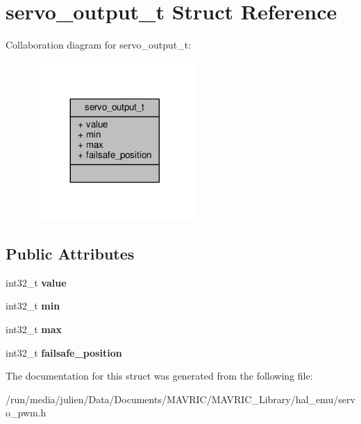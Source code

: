 \hypertarget{structservo__output__t}{\section{servo\+\_\+output\+\_\+t Struct Reference}
\label{structservo__output__t}
}


Collaboration diagram for servo\+\_\+output\+\_\+t\+:
\nopagebreak
\begin{figure}[H]
\begin{center}
\leavevmode
\includegraphics[width=176pt]{structservo__output__t__coll__graph}
\end{center}
\end{figure}
\subsection*{Public Attributes}
\begin{DoxyCompactItemize}
\item 
\hypertarget{structservo__output__t_a5e26ac76ea83f33afbe3e67ee8d6c77a}{int32\+\_\+t {\bfseries value}}\label{structservo__output__t_a5e26ac76ea83f33afbe3e67ee8d6c77a}

\item 
\hypertarget{structservo__output__t_a42b7da3c029455c14edc95ce24a130a9}{int32\+\_\+t {\bfseries min}}\label{structservo__output__t_a42b7da3c029455c14edc95ce24a130a9}

\item 
\hypertarget{structservo__output__t_a83c2d99b323a5e983512416be0366f75}{int32\+\_\+t {\bfseries max}}\label{structservo__output__t_a83c2d99b323a5e983512416be0366f75}

\item 
\hypertarget{structservo__output__t_a86899709f9318fb1960522116306f01b}{int32\+\_\+t {\bfseries failsafe\+\_\+position}}\label{structservo__output__t_a86899709f9318fb1960522116306f01b}

\end{DoxyCompactItemize}


The documentation for this struct was generated from the following file\+:\begin{DoxyCompactItemize}
\item 
/run/media/julien/\+Data/\+Documents/\+M\+A\+V\+R\+I\+C/\+M\+A\+V\+R\+I\+C\+\_\+\+Library/hal\+\_\+emu/servo\+\_\+pwm.\+h\end{DoxyCompactItemize}
